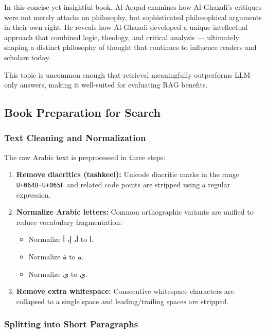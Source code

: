 \medskip
In this concise yet insightful book, Al-Aqqad examines how Al-Ghazali's critiques were not merely attacks on philosophy, but sophisticated philosophical arguments in their own right. He reveals how Al-Ghazali developed a unique intellectual approach that combined logic, theology, and critical analysis --- ultimately shaping a distinct philosophy of thought that continues to influence readers and scholars today.

\medskip
\noindent This topic is uncommon enough that retrieval meaningfully outperforms LLM-only answers, making it well-suited for evaluating RAG benefits.

\subsection{Book Preparation for Search}

\subsubsection{Text Cleaning and Normalization}

The raw Arabic text is preprocessed in three steps:

\begin{enumerate}
  \item \textbf{Remove diacritics (tashkeel):} Unicode diacritic marks in the range \texttt{U+064B}--\texttt{U+065F} and related code points are stripped using a regular expression.

  \item \textbf{Normalize Arabic letters:} Common orthographic variants are unified to reduce vocabulary fragmentation:
\begin{itemize}
  \item Normalize \textarabic{أ، إ، آ} to \textarabic{ا}.
  \item Normalize \textarabic{ة} to \textarabic{ه}.
  \item Normalize \textarabic{ى} to \textarabic{ي}.
\end{itemize}

  \item \textbf{Remove extra whitespace:} Consecutive whitespace characters are collapsed to a single space and leading/trailing spaces are stripped.
\end{enumerate}

\subsubsection{Splitting into Short Paragraphs}

